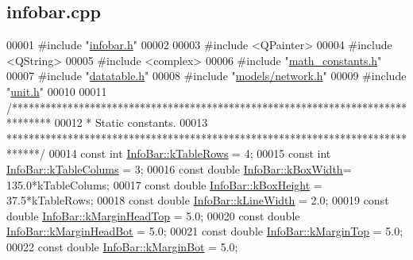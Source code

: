 \hypertarget{infobar_8cpp_source}{}\subsection{infobar.\+cpp}
\label{infobar_8cpp_source}

\begin{DoxyCode}
00001 \textcolor{preprocessor}{#include "\hyperlink{infobar_8h}{infobar.h}"}
00002 
00003 \textcolor{preprocessor}{#include <QPainter>}
00004 \textcolor{preprocessor}{#include <QString>}
00005 \textcolor{preprocessor}{#include <complex>}
00006 \textcolor{preprocessor}{#include "\hyperlink{math__constants_8h}{math\_constants.h}"}
00007 \textcolor{preprocessor}{#include "\hyperlink{datatable_8h}{datatable.h}"}
00008 \textcolor{preprocessor}{#include "\hyperlink{network_8h}{models/network.h}"}
00009 \textcolor{preprocessor}{#include "\hyperlink{unit_8h}{unit.h}"}
00010 
00011 \textcolor{comment}{/*******************************************************************************}
00012 \textcolor{comment}{ * Static constants.}
00013 \textcolor{comment}{ ******************************************************************************/}
00014 \textcolor{keyword}{const} \textcolor{keywordtype}{int} \hyperlink{class_info_bar_ad54d2dd19a63caf9d2476aace60ae3c5}{InfoBar::kTableRows}  = 4;
00015 \textcolor{keyword}{const} \textcolor{keywordtype}{int} \hyperlink{class_info_bar_a57e9e7c40a6fd2a56dd47a4512d65489}{InfoBar::kTableColums} = 3;
00016 \textcolor{keyword}{const} \textcolor{keywordtype}{double} \hyperlink{class_info_bar_a58f7773f4265d7e759f2eeb4c9aac48d}{InfoBar::kBoxWidth}= 135.0*kTableColums;
00017 \textcolor{keyword}{const} \textcolor{keywordtype}{double} \hyperlink{class_info_bar_aedf2e766968ea9ba3e691f24efb8c117}{InfoBar::kBoxHeight} = 37.5*kTableRows;
00018 \textcolor{keyword}{const} \textcolor{keywordtype}{double} \hyperlink{class_info_bar_a9592abdb63cc3cfffc6e5826f998a353}{InfoBar::kLineWidth} = 2.0;
00019 \textcolor{keyword}{const} \textcolor{keywordtype}{double} \hyperlink{class_info_bar_ae4ec64a4c58d29eb6c7378b4621bc6c2}{InfoBar::kMarginHeadTop} = 5.0;
00020 \textcolor{keyword}{const} \textcolor{keywordtype}{double} \hyperlink{class_info_bar_aed15b9f28cc4a43d509c3553b032fa5e}{InfoBar::kMarginHeadBot} = 5.0;
00021 \textcolor{keyword}{const} \textcolor{keywordtype}{double} \hyperlink{class_info_bar_a810c3286fc4d960d04ffbd31318ebff2}{InfoBar::kMarginTop} = 5.0;
00022 \textcolor{keyword}{const} \textcolor{keywordtype}{double} \hyperlink{class_info_bar_a18194bb46d36b00aa9f0d01f24a87617}{InfoBar::kMarginBot} = 5.0;

\end{DoxyCode}
